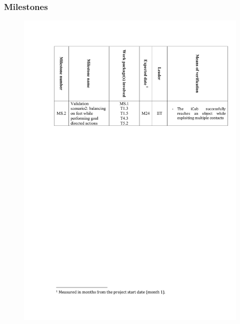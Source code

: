 \documentclass[12pt,a4paper,twoside]{article}
\begin{document}
\subsubsection{Milestones}

\begin{figure}[ht!]
\centering
\includegraphics[width=\textwidth]{./images/milestones.pdf}
\end{figure}

\newpage


% 

\end{document}

